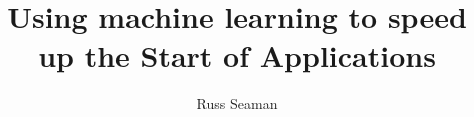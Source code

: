 \documentclass[11pt]{beamer}
\begin{document}
	\author{Russ Seaman}
	\title{Using machine learning to speed up the Start of Applications}
	\subject{CSCI599 | Senior Seminar}
	\begin{frame}[plain]
	\maketitle
\end{frame}

\begin{frame}
\frametitle{}
\end{frame}
\end{document}
